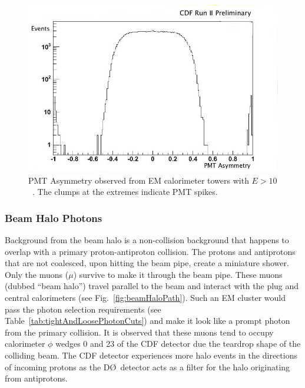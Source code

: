 \begin{figure}[hbtm]
\begin{centering}
\includegraphics[scale=0.37]{PMT_EM_Asym_twrE_gt_10.jpg}
\caption[PMT Asymmetry.]{PMT Asymmetry observed from EM calorimeter towers with \mbox{$E>10$}~\etUnits. The clumps at the extremes indicate PMT spikes.}
\label{fig_PMTAsymmetry}
\end{centering}
\end{figure}

\subsubsection{Beam Halo Photons}\label{halojets}
Background from the beam halo is a non-collision background that happens to overlap with a primary proton-antiproton collision. The protons and antiprotons that are not coalesced, upon hitting the beam pipe, create a miniature shower. Only the muons ($\mu$) survive to make it through the beam pipe. These muons (dubbed ``beam halo'') travel parallel to the beam and interact with the plug and central calorimeters (see Fig.~\ref{fig:beamHaloPath}). Such an EM cluster would pass the photon selection requirements (see Table~\ref{tab:tightAndLoosePhotonCuts}) and make it look like a prompt photon from the primary collision. It is observed that these muons tend to occupy calorimeter $\phi$ wedges 0 and 23 of the CDF detector due the teardrop shape of the colliding beam. The CDF detector experiences more halo events in the directions of incoming protons as the D\O~detector acts as a filter for the halo originating from antiprotons.


